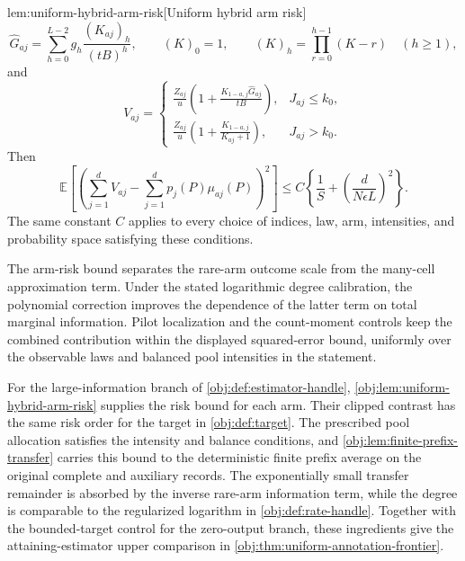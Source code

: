 \begin{lemmav}{lem:uniform-hybrid-arm-risk}[Uniform hybrid arm risk]
\[
\widehat G_{aj}
=\sum_{h=0}^{L-2}g_h\frac{(K_{aj})_h}{(tB)^h},
\qquad
(K)_0=1,\qquad
(K)_h=\prod_{r=0}^{h-1}(K-r)\quad(h\ge1),
\]
and
\[
V_{aj}=
\begin{cases}
\displaystyle
\frac{Z_{aj}}u
\left(1+\frac{K_{1-a,j}\widehat G_{aj}}{tB}\right),
&J_{aj}\le k_0,\\[6pt]
\displaystyle
\frac{Z_{aj}}u
\left(1+\frac{K_{1-a,j}}{K_{aj}+1}\right),
&J_{aj}>k_0.
\end{cases}
\]
Then
\[
\mathbb E\!\left[
\left(\sum_{j=1}^dV_{aj}
-\sum_{j=1}^dp_j(P)\mu_{aj}(P)\right)^2
\right]
\le
C\left\{\frac1S+
\left(\frac d{N\epsilon L}\right)^2\right\}.
\]
The same constant \(C\) applies to every choice of indices, law, arm, intensities, and probability space satisfying these conditions.
\end{lemmav}

The arm-risk bound separates the rare-arm outcome scale from the many-cell approximation term. Under the stated logarithmic degree calibration, the polynomial correction improves the dependence of the latter term on total marginal information. Pilot localization and the count-moment controls keep the combined contribution within the displayed squared-error bound, uniformly over the observable laws and balanced pool intensities in the statement.

For the large-information branch of \cref{obj:def:estimator-handle}, \cref{obj:lem:uniform-hybrid-arm-risk} supplies the risk bound for each arm. Their clipped contrast has the same risk order for the target in \cref{obj:def:target}. The prescribed pool allocation satisfies the intensity and balance conditions, and \cref{obj:lem:finite-prefix-transfer} carries this bound to the deterministic finite prefix average on the original complete and auxiliary records. The exponentially small transfer remainder is absorbed by the inverse rare-arm information term, while the degree is comparable to the regularized logarithm in \cref{obj:def:rate-handle}. Together with the bounded-target control for the zero-output branch, these ingredients give the attaining-estimator upper comparison in \cref{obj:thm:uniform-annotation-frontier}.
